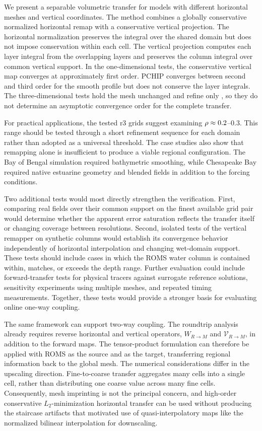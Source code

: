 %
%
We present a separable volumetric transfer for models with different horizontal meshes and vertical coordinates. The method combines a globally conservative normalized horizontal remap with a conservative vertical projection. The horizontal normalization preserves the integral over the shared domain but does not impose conservation within each cell. The vertical projection computes each \ROMS layer integral from the overlapping \MPAS layers and preserves the column integral over common vertical support. In the one-dimensional tests, the conservative vertical map converges at approximately first order. PCHIP converges between second and third order for the smooth profile but does not conserve the layer integrals. The three-dimensional tests hold the \MPAS mesh unchanged and refine only \ROMS, so they do not determine an asymptotic convergence order for the complete transfer.

For practical applications, the tested r3 grids suggest examining $\rho\approx0.2$--$0.3$. This range should be tested through a short refinement sequence for each domain rather than adopted as a universal threshold. The case studies also show that remapping alone is insufficient to produce a viable regional configuration. The Bay of Bengal simulation required bathymetric smoothing, while Chesapeake Bay required native estuarine geometry and blended fields in addition to the \MPAS forcing conditions.

Two additional tests would most directly strengthen the verification. First, comparing real fields over their common support on the finest available grid pair would determine whether the apparent error saturation reflects the transfer itself or changing coverage between resolutions. Second, isolated tests of the vertical remapper on synthetic columns would establish its convergence behavior independently of horizontal interpolation and changing wet-domain support. These tests should include cases in which the ROMS water column is contained within, matches, or exceeds the \MPAS depth range. Further evaluation could include forward-transfer tests for physical tracers against surrogate reference solutions, sensitivity experiments using multiple \MPAS meshes, and repeated timing measurements. Together, these tests would provide a stronger basis for evaluating online one-way coupling.

The same framework can support two-way coupling. The roundtrip analysis already requires reverse horizontal and vertical operators, \(W_{R\to M}\) and \(\mathcal{V}_{R\to M}\), in addition to the forward maps. The tensor-product formulation can therefore be applied with ROMS as the source and \MPAS as the target, transferring regional information back to the global mesh.
The numerical considerations differ in the upscaling direction. Fine-to-coarse transfer aggregates many \ROMS cells into a single \MPAS cell, rather than distributing one coarse \MPAS value across many fine \ROMS cells. Consequently, mesh imprinting is not the principal concern, and high-order conservative \(L_2\)-minimization  horizontal transfer can be used without producing the staircase artifacts that motivated use of quasi-interpolatory maps like the normalized bilinear interpolation for downscaling. 
